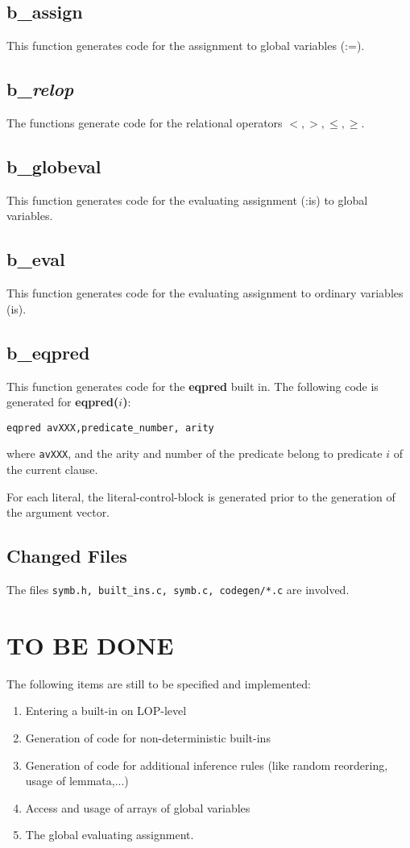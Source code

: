 \subsection{b\_assign}
This function generates code for the assignment to global
variables (:=).

\subsection{b\_{\em relop}}
The functions generate code for the relational operators
$<, >, \leq, \geq$.

\subsection{b\_globeval}
This function generates code for the evaluating assignment
(:is) to global variables.

\subsection{b\_eval}
This function generates code for the evaluating assignment
to ordinary variables (is).

\subsection{b\_eqpred}
This function generates code for the {\bf eqpred} built in.
The following code is generated for {\bf eqpred($i$)}:

\verb+eqpred avXXX,predicate_number, arity+

where {\tt avXXX}, and the arity and number of the predicate
belong to predicate $i$ of the current clause.


For each literal, the literal-control-block is generated prior to the
generation of the argument vector.

\subsection{Changed Files}
The files {\tt symb.h, built\_ins.c, symb.c, codegen/*.c} are
involved.

\section{TO BE DONE}
The following items are still to be specified and implemented:
\begin{enumerate}
\item
Entering a built-in on LOP-level
\item
Generation of code for non-deterministic built-ins
\item
Generation of code for additional inference rules
(like random reordering, usage of lemmata,...)
\item
Access and usage of arrays of global variables
\item
The global evaluating assignment.
\end{enumerate}


